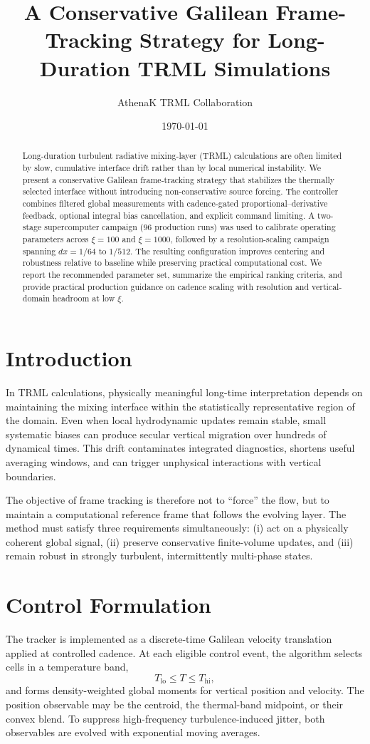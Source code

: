 \documentclass[10pt,twocolumn]{article}
\title{A Conservative Galilean Frame-Tracking Strategy for Long-Duration TRML Simulations}
\author{AthenaK TRML Collaboration}
\date{\today}
\begin{document}
\maketitle

\begin{abstract}
Long-duration turbulent radiative mixing-layer (TRML) calculations are often limited by slow, cumulative interface drift rather than by local numerical instability. We present a conservative Galilean frame-tracking strategy that stabilizes the thermally selected interface without introducing non-conservative source forcing. The controller combines filtered global measurements with cadence-gated proportional--derivative feedback, optional integral bias cancellation, and explicit command limiting. A two-stage supercomputer campaign (96 production runs) was used to calibrate operating parameters across $\xi=100$ and $\xi=1000$, followed by a resolution-scaling campaign spanning $dx=1/64$ to $1/512$. The resulting configuration improves centering and robustness relative to baseline while preserving practical computational cost. We report the recommended parameter set, summarize the empirical ranking criteria, and provide practical production guidance on cadence scaling with resolution and vertical-domain headroom at low $\xi$.
\end{abstract}

\section{Introduction}
In TRML calculations, physically meaningful long-time interpretation depends on maintaining the mixing interface within the statistically representative region of the domain. Even when local hydrodynamic updates remain stable, small systematic biases can produce secular vertical migration over hundreds of dynamical times. This drift contaminates integrated diagnostics, shortens useful averaging windows, and can trigger unphysical interactions with vertical boundaries.

The objective of frame tracking is therefore not to ``force'' the flow, but to maintain a computational reference frame that follows the evolving layer. The method must satisfy three requirements simultaneously: (i) act on a physically coherent global signal, (ii) preserve conservative finite-volume updates, and (iii) remain robust in strongly turbulent, intermittently multi-phase states.

\section{Control Formulation}
The tracker is implemented as a discrete-time Galilean velocity translation applied at controlled cadence. At each eligible control event, the algorithm selects cells in a temperature band,
\begin{equation}
T_{\mathrm{lo}} \le T \le T_{\mathrm{hi}},
\end{equation}
and forms density-weighted global moments for vertical position and velocity. The position observable may be the centroid, the thermal-band midpoint, or their convex blend. To suppress high-frequency turbulence-induced jitter, both observables are evolved with exponential moving averages.
\end{document}
